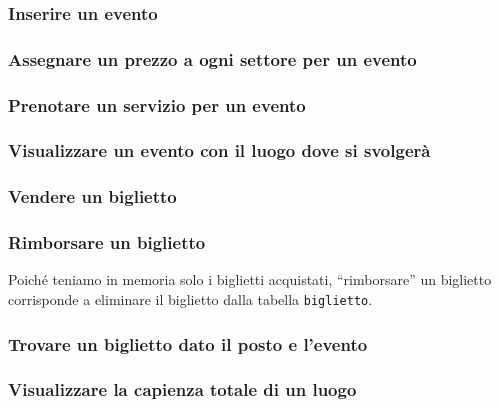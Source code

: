 \documentclass[a4paper,11pt]{article}
\begin{document}
\subsubsection{Inserire un evento}


\subsubsection{Assegnare un prezzo a ogni settore per un evento}


\subsubsection{Prenotare un servizio per un evento}


\subsubsection{Visualizzare un evento con il luogo dove si svolgerà}


\subsubsection{Vendere un biglietto}


\subsubsection{Rimborsare un biglietto}

Poiché teniamo in memoria solo i biglietti acquistati, ``rimborsare'' un biglietto corrisponde a eliminare il biglietto dalla tabella \texttt{biglietto}.



\subsubsection{Trovare un biglietto dato il posto e l'evento}


\subsubsection{Visualizzare la capienza totale di un luogo}

\end{document}
